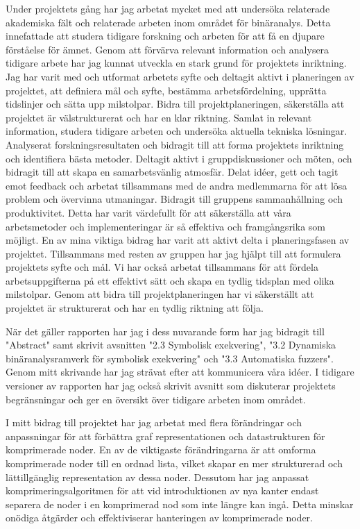 
Under projektets gång har jag arbetat mycket med att undersöka relaterade akademiska fält och relaterade arbeten inom området för binäranalys. 
Detta innefattade att studera tidigare forskning och arbeten för att få en djupare förståelse för ämnet. Genom att förvärva relevant information 
och analysera tidigare arbete har jag kunnat utveckla en stark grund för projektets inriktning. Jag har varit med och utformat arbetets syfte och 
deltagit aktivt i planeringen av projektet, att definiera mål och syfte, bestämma arbetsfördelning, upprätta tidslinjer och sätta upp milstolpar. 
Bidra till projektplaneringen, säkerställa att projektet är välstrukturerat och har en klar riktning. Samlat in relevant information, studera 
tidigare arbeten och undersöka aktuella tekniska lösningar. Analyserat forskningsresultaten och bidragit till att forma projektets inriktning och 
identifiera bästa metoder. Deltagit aktivt i gruppdiskussioner och möten, och bidragit till att skapa en samarbetsvänlig atmosfär. Delat idéer, 
gett och tagit emot feedback och arbetat tillsammans med de andra medlemmarna för att lösa problem och övervinna utmaningar. Bidragit till gruppens 
sammanhållning och produktivitet. Detta har varit värdefullt för att säkerställa att våra arbetsmetoder och implementeringar är så effektiva och 
framgångsrika som möjligt. En av mina viktiga bidrag har varit att aktivt delta i planeringsfasen av projektet. Tillsammans med resten av gruppen 
har jag hjälpt till att formulera projektets syfte och mål. Vi har också arbetat tillsammans för att fördela arbetsuppgifterna på ett effektivt sätt 
och skapa en tydlig tidsplan med olika milstolpar. Genom att bidra till projektplaneringen har vi säkerställt att projektet är 
strukturerat och har en tydlig riktning att följa.

När det gäller rapporten har jag i dess nuvarande form har jag bidragit till "Abstract" samt skrivit avsnitten "2.3 Symbolisk exekvering", 
"3.2 Dynamiska binäranalysramverk för symbolisk exekvering" och "3.3 Automatiska fuzzers". Genom mitt skrivande har jag strävat efter att 
kommunicera våra idéer. I tidigare versioner av rapporten har jag också skrivit avsnitt som diskuterar projektets begränsningar och ger 
en översikt över tidigare arbeten inom området. 

I mitt bidrag till projektet har jag arbetat med flera förändringar och anpassningar för att förbättra graf 
representationen och datastrukturen för komprimerade noder. En av de viktigaste förändringarna är att omforma 
komprimerade noder till en ordnad lista, vilket skapar en mer strukturerad och lättillgänglig representation av dessa noder. 
Dessutom har jag anpassat komprimeringsalgoritmen för att vid introduktionen av nya kanter endast separera de noder 
i en komprimerad nod som inte längre kan ingå. Detta minskar onödiga åtgärder och effektiviserar hanteringen av 
komprimerade noder.

